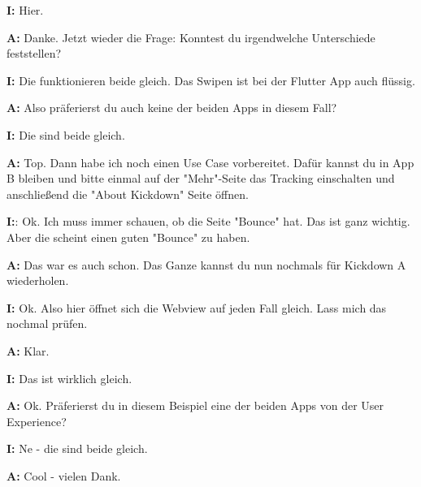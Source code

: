\begin{myparindent}{0pt}
\textbf{I:} Hier.

\textbf{A:} Danke. Jetzt wieder die Frage: Konntest du irgendwelche Unterschiede feststellen?

\textbf{I:} Die funktionieren beide gleich. Das Swipen ist bei der Flutter App auch flüssig.

\textbf{A:} Also präferierst du auch keine der beiden Apps in diesem Fall?

\textbf{I:} Die sind beide gleich.

\textbf{A:} Top. Dann habe ich noch einen Use Case vorbereitet. Dafür kannst du in App B bleiben und bitte einmal auf der "Mehr"-Seite das Tracking einschalten und anschließend die "About Kickdown" Seite öffnen. 

\textbf{I:}: Ok. Ich muss immer schauen, ob die Seite "Bounce" hat. Das ist ganz wichtig. Aber die scheint einen guten "Bounce" zu haben.

\textbf{A:} Das war es auch schon. Das Ganze kannst du nun nochmals für Kickdown A wiederholen. 

\textbf{I:} Ok. Also hier öffnet sich die Webview auf jeden Fall gleich. Lass mich das nochmal prüfen. 

\textbf{A:} Klar.

\textbf{I:} Das ist wirklich gleich. 

\textbf{A:} Ok. Präferierst du in diesem Beispiel eine der beiden Apps von der User Experience?

\textbf{I:} Ne - die sind beide gleich. 

\textbf{A:} Cool - vielen Dank.

\end{myparindent}